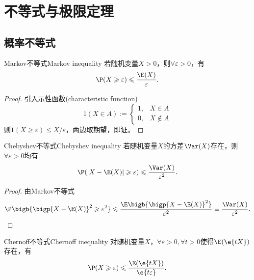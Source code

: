 \chapter{不等式与极限定理}

\section{概率不等式}

\begin{theorem}{Markov不等式}{Markov inequality}
	若随机变量$X>0$，则$\forall\varepsilon>0$，有
	\begin{equation}
		\label{eqn:Markov ineq}
		\P(X\geqslant\varepsilon)\leqslant\frac{\E(X)}\varepsilon.
	\end{equation}
\end{theorem}

\begin{proof}
	引入示性函数(characteristic function)
	\begin{equation}
		1(X\in A):=\begin{cases}
			1,&X\in A\\
			0,&X\notin A
		\end{cases}
	\end{equation}
	则$1(X\geqslant\varepsilon)\leqslant X/\varepsilon$，两边取期望，即证。
\end{proof}

\begin{theorem}{Chebyshev不等式}{Chebyshev inequality}
	若随机变量$X$的方差$\Var(X)$存在，则$\forall\varepsilon>0$均有
	\begin{equation}
		\P(|X-\E(X)|\geqslant\varepsilon)\leqslant\frac{\Var(X)}{\varepsilon^2}.
	\end{equation}
\end{theorem}

\begin{proof}
	由Markov不等式
	\[
		\P\bigb{\bigp{X-\E(X)}^2\geqslant\varepsilon^2}\leqslant\frac{\E\bigb{\bigp{X-\E(X)}^2}}{\varepsilon^2}\equiv\frac{\Var(X)}{\varepsilon^2}.
		\qedhere
	\]
\end{proof}

\begin{theorem}{Chernoff不等式}{Chernoff inequality}
	对随机变量$X$，$\forall\varepsilon>0,\forall t>0$使得$\E(\e{tX})$存在，有
	\begin{equation}
		\P(X\geqslant\varepsilon)\leqslant\frac{\E(\e{tX})}{\e{t\varepsilon}}.
	\end{equation}
\end{theorem}

